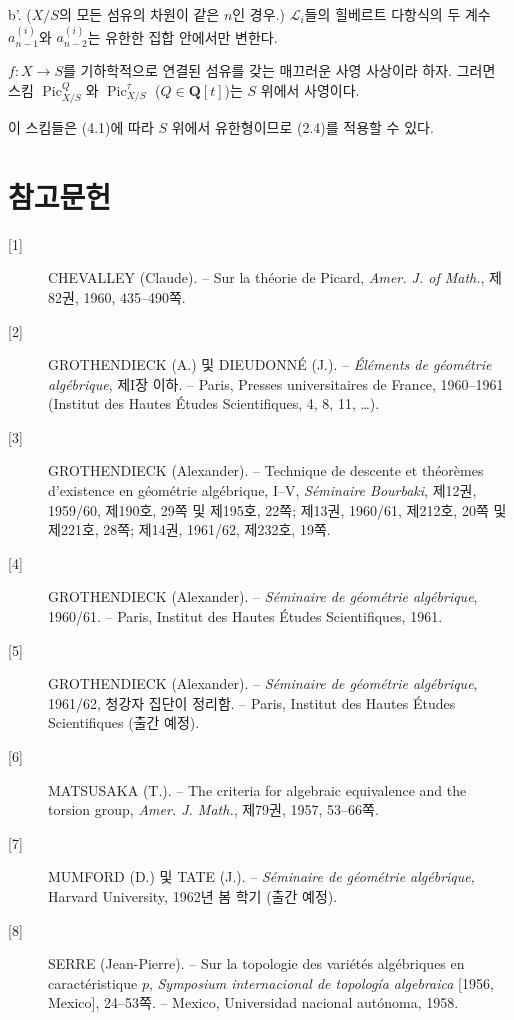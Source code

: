 \noindent b'. ($X/S$의 모든 섬유의 차원이 같은 $n$인 경우.)
$\mathcal L_i$들의 힐베르트 다항식의 두 계수 $a_{n-1}^{(i)}$와
$a_{n-2}^{(i)}$는 유한한 집합 안에서만 변한다.


 $f:X\longrightarrow S$를 기하학적으로 연결된 섬유를
갖는 매끄러운 사영 사상이라 하자. 그러면 스킴
$\operatorname{Pic}_{X/S}^Q$와 $\operatorname{Pic}_{X/S}^\tau$
($Q\in\mathbf Q[t]$)는 $S$ 위에서 사영이다.

이 스킴들은 (4.1)에 따라 $S$ 위에서 유한형이므로 (2.4)를 적용할 수 있다.

\section*{참고문헌}

\begin{description}
\item[{[1]}] CHEVALLEY (Claude). -- Sur la théorie de Picard,
\emph{Amer. J. of Math.}, 제82권, 1960, 435--490쪽.

\item[{[2]}] GROTHENDIECK (A.) 및 DIEUDONNÉ (J.). -- \emph{Éléments de
géométrie algébrique}, 제I장 이하. -- Paris, Presses universitaires de France,
1960--1961 (Institut des Hautes Études Scientifiques, 4, 8, 11, \ldots).

\item[{[3]}] GROTHENDIECK (Alexander). -- Technique de descente et théorèmes
d'existence en géométrie algébrique, I--V, \emph{Séminaire Bourbaki}, 제12권,
1959/60, 제190호, 29쪽 및 제195호, 22쪽; 제13권, 1960/61, 제212호, 20쪽 및
제221호, 28쪽; 제14권, 1961/62, 제232호, 19쪽.

\item[{[4]}] GROTHENDIECK (Alexander). -- \emph{Séminaire de géométrie
algébrique}, 1960/61. -- Paris, Institut des Hautes Études Scientifiques, 1961.

\item[{[5]}] GROTHENDIECK (Alexander). -- \emph{Séminaire de géométrie
algébrique}, 1961/62, 청강자 집단이 정리함. -- Paris, Institut des Hautes
Études Scientifiques (출간 예정).

\item[{[6]}] MATSUSAKA (T.). -- The criteria for algebraic equivalence and the
torsion group, \emph{Amer. J. Math.}, 제79권, 1957, 53--66쪽.

\item[{[7]}] MUMFORD (D.) 및 TATE (J.). -- \emph{Séminaire de géométrie
algébrique}, Harvard University, 1962년 봄 학기 (출간 예정).

\item[{[8]}] SERRE (Jean-Pierre). -- Sur la topologie des variétés algébriques
en caractéristique $p$, \emph{Symposium internacional de topología algebraica}
[1956, Mexico], 24--53쪽. -- Mexico, Universidad nacional autónoma, 1958.
\end{description}

